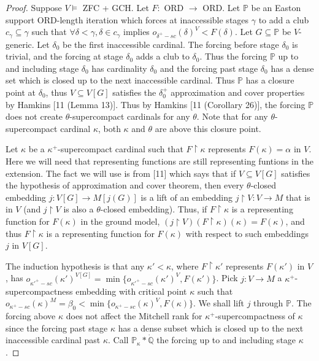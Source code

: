 \documentclass[10pt,leqno]{amsart}
\begin{document}
\begin{proof} Suppose $V \models$ ZFC + GCH. Let $F:$ ORD $\to$ ORD. Let $\mathbb{P}$ be an Easton support ORD-length iteration which forces at inaccessible stages $\gamma$ to add a club $c_{\gamma} \subseteq \gamma$ such that $\forall \delta < \gamma, \delta \in c_{\gamma}$ implies $o_{\delta^+-sc}(\delta)^V < F(\delta)$. Let $G \subseteq \mathbb{P}$ be $V$-generic. Let $\delta_0$ be the first inaccessible cardinal. The forcing before stage $\delta_0$ is trivial, and the forcing at stage $\delta_0$ adds a club to $\delta_0$. Thus the forcing $\mathbb{P}$ up to and including stage $\delta_0$ has cardinality $\delta_0$ and the forcing past stage $\delta_0$ has a dense set which is closed up to the next inaccessible cardinal. Thus $\mathbb{P}$ has a closure point at $\delta_0$, thus $V \subseteq V[G]$ satisfies the $\delta_0^+$ approximation and cover properties by Hamkins [11 (Lemma 13)]. Thus by Hamkins [11 (Corollary 26)], the forcing $\mathbb{P}$ does not create $\theta$-supercompact cardinals for any $\theta$. Note that for any $\theta$-supercompact cardinal $\kappa$, both $\kappa$ and $\theta$ are above this closure point.

Let $\kappa$ be a $\kappa^+$-supercompact cardinal such that $F \upharpoonright \kappa$ represents $F(\kappa) = \alpha$ in $V$. Here we will need that representing functions are still representing funtions in the extension. The fact we will use is from [11] which says that if $V \subseteq V[G]$ satisfies the hypothesis of approximation and cover theorem, then every $\theta$-closed embedding $j:V[G] \to M[j(G)]$ is a lift of an embedding $j\upharpoonright V: V \to M$ that is in $V$ (and $j \upharpoonright V$ is also a $\theta$-closed embedding). Thus, if $F \upharpoonright \kappa$ is a representing function for $F(\kappa)$ in the ground model, $(j \upharpoonright V)(F \upharpoonright \kappa)(\kappa) = F(\kappa)$, and thus $F \upharpoonright \kappa$ is a representing function for $F(\kappa)$ with respect to such embeddings $j$ in $V[G]$.

The induction hypothesis is that any $\kappa' < \kappa$, where $F \upharpoonright \kappa'$ represents $F(\kappa')$ in $V$, has $o_{\kappa'^+-sc}(\kappa')^{V[G]} = \min\{o_{\kappa'^+-sc}(\kappa')^V, F(\kappa')\}$. Pick $j:V \to M$ a $\kappa^+$-supercompactness embedding with critical point $\kappa$ such that $o_{\kappa^+-sc}(\kappa)^M = \beta_0 < \min\{o_{\kappa^+-sc}(\kappa)^V, F(\kappa)\}$. We shall lift $j$ through $\mathbb{P}$. The forcing above $\kappa$ does not affect the Mitchell rank for $\kappa^+$-supercompactness of $\kappa$ since the forcing past stage $\kappa$ has a dense subset which is closed up to the next inaccessible cardinal past $\kappa$. Call $\mathbb{P}_{\kappa}*\dot{\mathbb{Q}}$ the forcing up to and including stage $\kappa$.


\end{proof}
\end{document}
